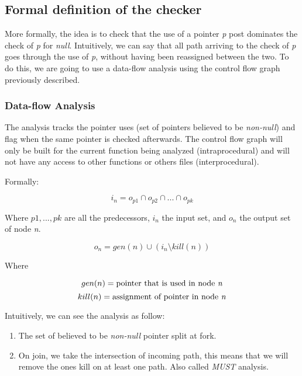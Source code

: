 \subsection{Formal definition of the checker}
\label{subsec:checker_formal_definition}
More formally, the idea is to check that the use of a pointer \emph{p} post dominates the check of \emph{p} for \emph{null}.
Intuitively, we can say that all path arriving to the check of \emph{p} goes through the use of \emph{p}, without having been reassigned between the two. 
To do this, we are going to use a data-flow analysis using the control flow graph previously described.

\subsubsection{Data-flow Analysis}
\label{subsubsec:data_flow_analysis}

The analysis tracks the pointer uses (set of pointers believed to be \emph{non-null}) and flag when the same pointer is checked afterwards.
The control flow graph will only be built for the current function being analyzed (intraprocedural) and will not have any access to other functions or others files (interprocedural).

Formally:

\begin{equation}\label{eqn:dataflow1}
i_{n} = o_{p1}  \cap   o_{p2}  \cap  ... \cap   o_{pk}
\end{equation}

Where $p1, ..., pk$ are all the predecessors, $i_{n}$ the input set, and  $o_{n}$ the output set of node \emph{n}.

\begin{equation}\label{eqn:dataflow2}
o_{n} = gen(n)  \cup   (i_{n} \setminus kill(n))
\end{equation}

Where

\begin{equation}\label{eqn:dataflow3}
gen(n) =\text{pointer that is used in node \emph{n}}
\end{equation}
\begin{equation}\label{eqn:dataflow4}
kill(n) = \text{assignment of pointer in node \emph{n}}
\end{equation}

Intuitively, we can see the analysis as follow:
\begin{enumerate}
	\item The set of believed to be \emph{non-null} pointer split at fork. \newline 
	\item On join, we take the intersection of incoming path, this means that we will remove the ones kill on at least one path. Also called \emph{MUST} analysis. \newline 
\end{enumerate}


